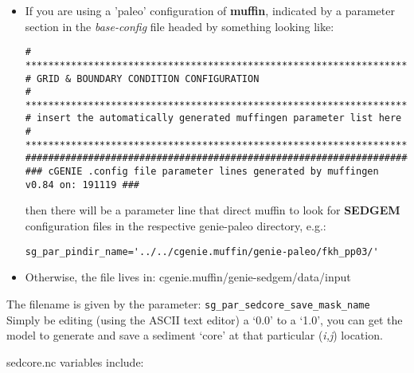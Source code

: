 \documentclass[11pt,fleqn]{book} %
\begin{document}
\begin{itemize}[noitemsep]
\vspace{1mm}
\item 
If you are using a 'paleo' configuration of \textbf{muffin}, indicated by a parameter section in the \textit{base-config} file headed by something looking like:
\footnotesize\begin{verbatim}
# *******************************************************************
# GRID & BOUNDARY CONDITION CONFIGURATION
# *******************************************************************
# insert the automatically generated muffingen parameter list here
# *******************************************************************
###################################################################################
### cGENIE .config file parameter lines generated by muffingen v0.84 on: 191119 ###
\end{verbatim}\normalsize
then there will be a parameter line that direct muffin to look for \textbf{SEDGEM} configuration files in the respective \textsf{\footnotesize genie-paleo } directory, e.g.:
\vspace{-1mm}\small\begin{verbatim}
sg_par_pindir_name='../../cgenie.muffin/genie-paleo/fkh_pp03/'
\end{verbatim}\normalsize\vspace{-1mm}
\vspace{1mm}
\item Otherwise, the file lives in: \textsf{\footnotesize cgenie.muffin/genie-sedgem/data/input}
\end{itemize}
\vspace{1mm}
The filename is given by the parameter: \texttt{sg\_par\_sedcore\_save\_mask\_name}
\\Simply be editing (using the ASCII text editor) a ‘0.0’ to a ‘1.0’, you can get the model to generate and save a sediment ‘core’ at that particular (\textit{i,j}) location.

\pagebreak

\textsf{\footnotesize sedcore.nc } variables include:
\end{document}

